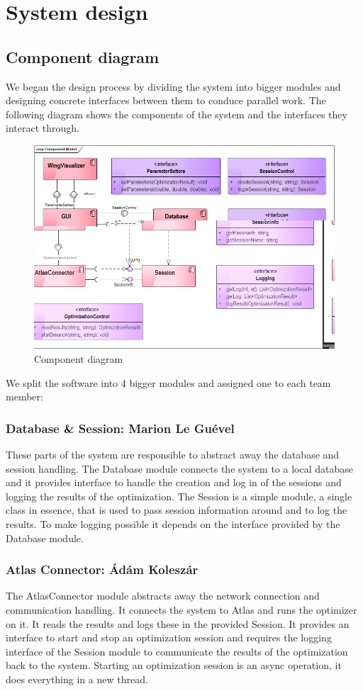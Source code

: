 \documentclass[10pt,a4paper]{report}
\begin{document}
\pagebreak
\chapter{System design}
\section{Component diagram}
We began the design process by dividing the system into bigger modules and designing concrete interfaces between them to conduce parallel work. The following diagram shows the components of the system and the interfaces they interact through.\\
\begin{figure}[h!]
\includegraphics[width=\textwidth]{CompModel.jpg}
\caption{Component diagram}
\end{figure}
 We split the software into 4 bigger modules and assigned one to each team member:\\
\subsection{Database \& Session: Marion Le Guével}
These parts of the system are responsible to abstract away the database and session handling. The Database module connects the system to a local database and it provides interface to handle the creation and log in of the sessions and logging the results of the optimization. The Session is a simple module, a single class in essence, that is used to pass session information around and to log the  results. To make logging possible it depends on the interface provided by the Database module.
\subsection{Atlas Connector: Ádám Koleszár}
The AtlasConnector module abstracts away the network connection and communication handling. It connects the system to Atlas and runs the optimizer on it. It reads the results and logs these in the provided Session. It provides an interface to start and stop an optimization session and requires the logging interface of the Session module to communicate the results of the optimization back to the system. Starting an optimization session is an async operation, it does everything in a new thread. 
\end{document}
